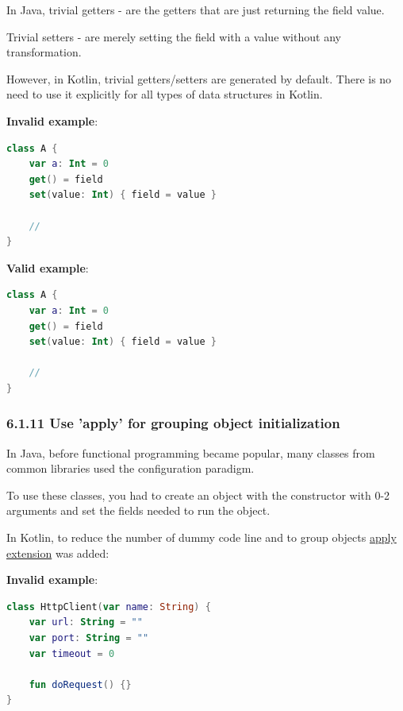 {{{{In Java, trivial getters - are the getters that are just returning the field value.

Trivial setters - are merely setting the field with a value without any transformation.

However, in Kotlin, trivial getters/setters are generated by default. There is no need to use it explicitly for all types of data structures in Kotlin.



\textbf{Invalid example}:

\begin{lstlisting}[language=Kotlin]
class A {
    var a: Int = 0 
    get() = field
    set(value: Int) { field = value }

    //
}
\end{lstlisting}


\textbf{Valid example}:

\begin{lstlisting}[language=Kotlin]
class A {
    var a: Int = 0 
    get() = field
    set(value: Int) { field = value }

    //
}
\end{lstlisting}


\subsubsection*{\textbf{6.1.11 Use 'apply' for grouping object initialization}}
\leavevmode\newline

\label{sec:6.1.11}

In Java, before functional programming became popular, many classes from common libraries used the configuration paradigm.

To use these classes, you had to create an object with the constructor with 0-2 arguments and set the fields needed to run the object.

In Kotlin, to reduce the number of dummy code line and to group objects \href{https://kotlinlang.org/api/latest/jvm/stdlib/kotlin/apply.html}{apply extension} was added:  

 

\textbf{Invalid example}:

\begin{lstlisting}[language=Kotlin]
class HttpClient(var name: String) {
    var url: String = ""
    var port: String = ""
    var timeout = 0
    
    fun doRequest() {}
}


\end{lstlisting}}}}}
